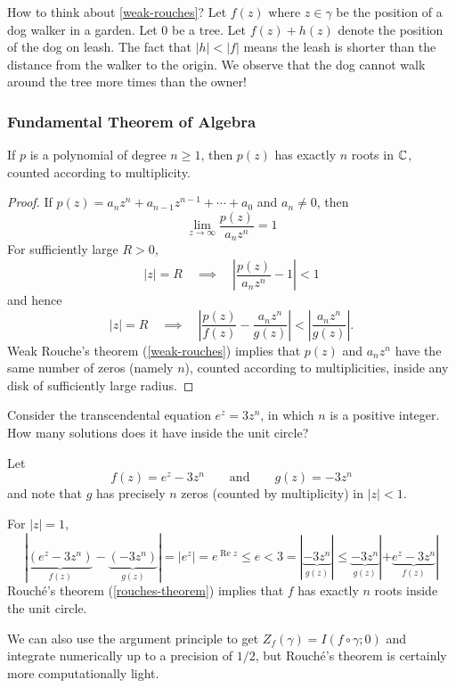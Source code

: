 \documentclass[12pt]{article}
\begin{document}
\rmk How to think about \cref{weak-rouches}? Let $f(z)$ where $z\in \gamma$ be the position of a dog walker in a garden. Let 0 be a tree. Let $f(z)+h(z)$ denote the position of the dog on leash. The fact that $|h|<|f|$ means the leash is shorter than the distance from the walker to the origin. We observe that the dog cannot walk around the tree more times than the owner!

\subsubsection{Fundamental Theorem of Algebra}
\begin{corollary}[FTA]
    If $p$ is a polynomial of degree $n \geq 1$, then $p(z)$ has exactly $n$ roots in $\mathbb{C}$, counted according to multiplicity.
\end{corollary}
\begin{proof}
    If $p(z)=a_{n}z^{n}+a_{n-1}z^{n-1}+\cdots+a_{0}$ and $a_{n}\neq0$, then \[\lim_{z\to\infty}\frac{p(z)}{a_{n}z^{n}}=1\]
    For sufficiently large $R>0$,
    $$|z|=R\quad\implies\quad\left|\frac{p(z)}{a_{n}z^{n}}-1\right|<1$$
    and hence   
    $$|z|=R\quad\implies\quad\left|\frac{p(z)}{f(z)}-\frac{a_{n}z^{n}}{g(z)}\right|<\left|\frac{a_{n}z^{n}}{g(z)}\right|.$$
    Weak Rouche's theorem (\cref{weak-rouches}) implies that $p(z)$ and $a_nz^{n}$ have the same number of zeros (namely $n$), counted according to multiplicities, inside any disk of sufficiently large radius.    
\end{proof}

\eg Consider the transcendental equation $e^{z}=3z^{n}$, in which $n$ is a positive integer. How many solutions does it have inside the unit circle?

Let $$f(z)=e^{z}-3z^{n}\qquad\text{and}\qquad g(z)=-3z^{n}$$ and note that $g$ has precisely $n$ zeros (counted by multiplicity) in $|z|<1$. 

For $|z|=1$,
$$|\underbrace{(e^{z}-3z^{n})}_{f(z)}-\underbrace{(-3z^{n})}_{g(z)}|=|e^{z}|=e^{\operatorname{Re}z}\leq e<3=|\underbrace{-3z^{n}}_{g(z)}|\leq \underbrace{-3z^{n}}_{g(z)}| + \underbrace{e^{z}-3z^n}_{f(z)}|$$
Rouch\'e's theorem (\cref{rouches-theorem}) implies that $f$ has exactly $n$ roots inside the unit circle.

\rmk We can also use the argument principle to get $Z_f(\gamma)=I(f\circ \gamma; 0)$ and integrate numerically up to a precision of $1/2$, but Rouch\'e's theorem is certainly more computationally light.
\end{document}
